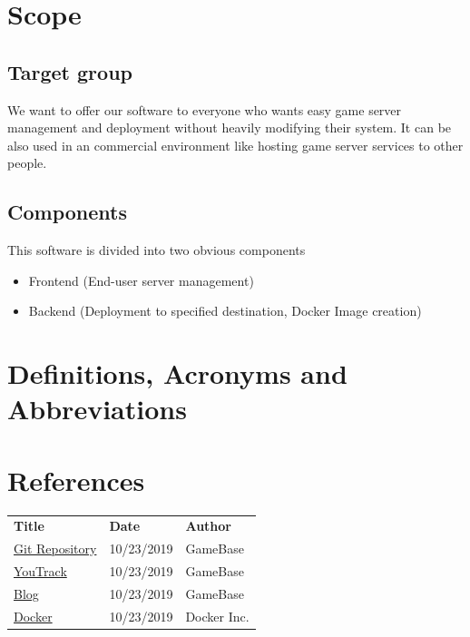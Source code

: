 \documentclass[a4paper,12pt,chapterprefix=false,bibliography=totoc,listof=totoc,]{scrreprt}
\begin{document}
\section{Scope}
\subsection*{Target group}
We want to offer our software to everyone who wants easy game server management and deployment without heavily modifying their system. It can be also used in an commercial environment like hosting game server services to other people.

\subsection*{Components}
This software is divided into two obvious components
\begin{itemize}
	\item Frontend (End-user server management)
	\item Backend (Deployment to specified destination, Docker Image creation)
\end{itemize}


\section{Definitions, Acronyms and Abbreviations}
\printabbreviations[title={}]

\section{References}
\begin{table}[H]
	\centering
	\everyrow{\hline}
	\begin{tabu} to \textwidth {|X[c]|X[c]|X[c]|}
		\textbf{Title} & \textbf{Date} & \textbf{Author} \\
		\href{https://gitlab.tandashi.de/GameBase}{Git Repository} & 10/23/2019 & GameBase \\
		\href{https://youtrack.gahr.dev}{YouTrack} & 10/23/2019 & GameBase \\
		\href{https://gahr.dev}{Blog} & 10/23/2019 & GameBase \\
		\href{https://www.docker.com/}{Docker} & 10/23/2019 & Docker Inc. \\		
	\end{tabu}
	\label{tab:references-tabview}
\end{table}
\end{document}
